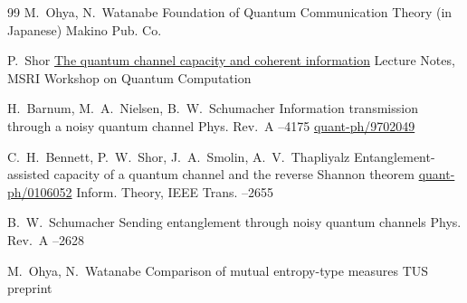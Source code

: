 \begin{thebibliography}{99}
\by M.~Ohya, N.~Watanabe
\book Foundation of Quantum Communication Theory (in Japanese)
\publ Makino Pub. Co.

\by P.~Shor
\preprint \href{http://www.msri.org/publications/ln/msri/2002/quantumcrypto/shor/1/meta/aux/shor.pdf}{The quantum channel capacity and coherent information}
\preprintinfo Lecture Notes, MSRI Workshop on Quantum Computation


\by H.~Barnum, M.~A.~Nielsen, B.~W.~Schumacher
\paper Information transmission through a noisy quantum channel
\jour Phys. Rev.~A
--4175 
\arxiv 	\href{http://arxiv.org/abs/quant-ph/9702049}{quant-ph/9702049}

\by C.~H.~Bennett, P.~W.~Shor, J.~A.~Smolin, A.~V.~Thapliyalz
\paper Entanglement-assisted capacity of a quantum channel and the reverse Shannon theorem
\arxiv \href{http://arxiv.org/abs/quant-ph/0106052}{quant-ph/0106052}
\jour Inform. Theory, IEEE Trans.
–2655

\by B.~W.~Schumacher
\paper Sending entanglement through noisy quantum channels
\jour Phys. Rev.~A
–2628 



\by M.~Ohya, N.~Watanabe
\preprint Comparison of mutual entropy-type measures
\preprintinfo TUS preprint







\end{thebibliography}


\lfoot[]{}
\rfoot[]{}



\vskip1mm \par{\footnotesize
\hskip6.5cm \theengdate \par
\hskip6.5cm\theengrevdate\par}



\newpage

%
%
